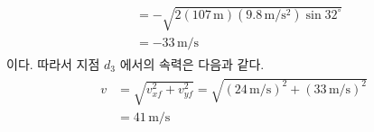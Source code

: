 \documentclass[floatfix,nofootinbib,superscriptaddress,fleqn]{revtex4-2}
\begin{document}
\begin{itemize}
\begin{align}
\begin{split}
      &=-\sqrt{2(107\,\mathrm{m})(9.8\,\mathrm{m/s^2})\sin{32^\circ}} \\
      &=-33\,\mathrm{m/s}
    \end{split}
  \end{align}
  이다. 따라서 지점 $d_3$ 에서의 속력은 다음과 같다.
  \begin{align}
    \begin{split}
      v &= \sqrt{v_{xf}^2+v_{yf}^2} = \sqrt{(24\,\mathrm{m/s})^2+(33\,\mathrm{m/s})^2} \\
      &= 41\,\mathrm{m/s}
    \end{split}
  \end{align}
\end{itemize} 
\end{document}
